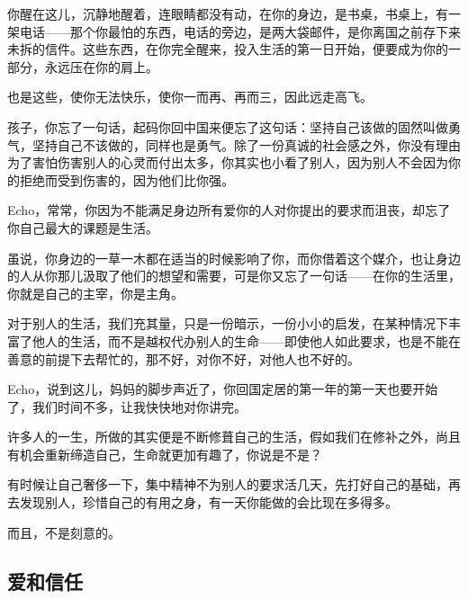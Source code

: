 \par 你醒在这儿，沉静地醒着，连眼睛都没有动，在你的身边，是书桌，书桌上，有一架电话——那个你最怕的东西，电话的旁边，是两大袋邮件，是你离国之前存下来未拆的信件。这些东西，在你完全醒来，投入生活的第一日开始，便要成为你的一部分，永远压在你的肩上。
\par 也是这些，使你无法快乐，使你一而再、再而三，因此远走高飞。
\par 孩子，你忘了一句话，起码你回中国来便忘了这句话：坚持自己该做的固然叫做勇气，坚持自己不该做的，同样也是勇气。除了一份真诚的社会感之外，你没有理由为了害怕伤害别人的心灵而付出太多，你其实也小看了别人，因为别人不会因为你的拒绝而受到伤害的，因为他们比你强。
\par Echo，常常，你因为不能满足身边所有爱你的人对你提出的要求而沮丧，却忘了你自己最大的课题是生活。
\par 虽说，你身边的一草一木都在适当的时候影响了你，而你借着这个媒介，也让身边的人从你那儿汲取了他们的想望和需要，可是你又忘了一句话——在你的生活里，你就是自己的主宰，你是主角。
\par 对于别人的生活，我们充其量，只是一份暗示，一份小小的启发，在某种情况下丰富了他人的生活，而不是越权代办别人的生命——即使他人如此要求，也是不能在善意的前提下去帮忙的，那不好，对你不好，对他人也不好的。
\par Echo，说到这儿，妈妈的脚步声近了，你回国定居的第一年的第一天也要开始了，我们时间不多，让我快快地对你讲完。
\par 许多人的一生，所做的其实便是不断修葺自己的生活，假如我们在修补之外，尚且有机会重新缔造自己，生命就更加有趣了，你说是不是？
\par 有时候让自己奢侈一下，集中精神不为别人的要求活几天，先打好自己的基础，再去发现别人，珍惜自己的有用之身，有一天你能做的会比现在多得多。
\par 而且，不是刻意的。



\subsection{爱和信任}

